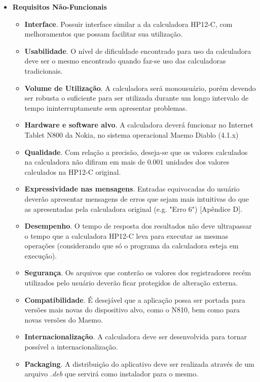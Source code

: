\begin{itemize}
\begin{itemize}
	\end{itemize}
 \item \textbf{Requisitos Não-Funcionais}
	\begin{itemize}
	 \item \textbf{Interface}. Possuir interface similar a da calculadora HP12-C, com melhoramentos que possam facilitar sua utilização.
	 \item \textbf{Usabilidade}. O nível de dificuldade encontrado para uso da calculadora deve ser o mesmo encontrado quando faz-se uso das calculadoras tradicionais.
	 \item \textbf{Volume de Utilização}. A calculadora será monousuário, porém devendo ser robusta o suficiente para ser utilizada durante um longo intervalo de tempo ininterruptamente sem apresentar problemas.
	 \item \textbf{Hardware e software alvo}. A calculadora deverá funcionar no Internet Tablet N800 da Nokia, no sistema operacional Maemo Diablo (4.1.x) 
	 \item \textbf{Qualidade}. Com relação a precisão, deseja-se que os valores calculados na calculadora não difiram em mais de $0.001$ unidades dos valores calculados na HP12-C original.
	 \item \textbf{Expressividade nas mensagens}. Entradas equivocadas do usuário deverão apresentar mensagens de erros que sejam mais intuitivas do que as apresentadas pela calculadora original (e.g. "Erro 6") [Apêndice D].
	 \item \textbf{Desempenho}. O tempo de resposta dos resultados não deve ultrapassar o tempo que a calculadora HP12-C leva para executar as mesmas operações (considerando que só o programa da calculadora esteja em execução).
	 \item \textbf{Segurança}. Os arquivos que conterão os valores dos registradores recém utilizados pelo usuário deverão ficar protegidos de alteração externa.
	 \item \textbf{Compatibilidade}. É desejável que a aplicação possa ser portada para versões mais novas do dispositivo alvo, como o N810, bem como para novas versões do Maemo.
	 \item \textbf{Internacionalização}. A calculadora deve ser desenvolvida para tornar possível a internacionalização. 
	 \item \textbf{Packaging}. A distribuição do aplicativo deve ser realizada através de um arquivo \textit{.deb} que servirá como instalador para o mesmo.
	\end{itemize}
\end{itemize}
